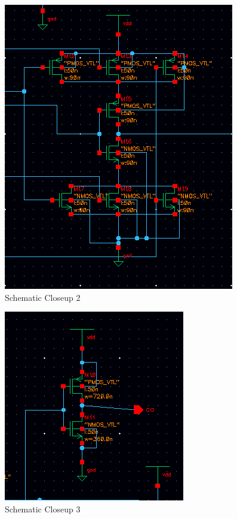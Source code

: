 \documentclass[12pt]{article}
\begin{document}
\begin{figure}[H]
\centering
\includegraphics[width=\linewidth]{schematic-closeup-2}
\caption{Schematic Closeup 2}
\label{fig:schematic-closeup-2}
\end{figure}

\begin{figure}[H]
\centering
\includegraphics[width=0.5\linewidth]{schematic-closeup-3}
\caption{Schematic Closeup 3}
\label{fig:schematic-closeup-3}
\end{figure}
\end{document}
